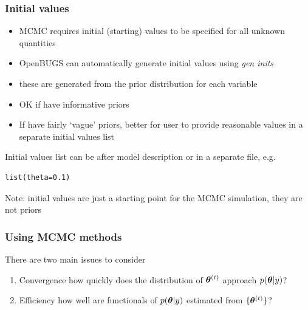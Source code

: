  \begin{frame}[fragile]

\frametitle{Initial values}

\begin{itemize}
\item MCMC requires initial (starting) values to be specified for all unknown quantities\vspace{2mm}
\item OpenBUGS can automatically generate initial values using \emph{gen inits}\vspace{1mm}
      \bi
      \item these are generated from the prior distribution for each variable\vspace{2mm}
      \ei
\item OK if have informative priors\vspace{2mm}
\item  If have fairly \lq vague' priors, better for user to provide reasonable values in a separate initial values list\vspace{2mm}
\end{itemize}

Initial values list can be after model description or in a separate file, e.g.\vspace{-1mm}
\begin{verbatim}
list(theta=0.1)
\end{verbatim}\vspace{-1mm}
Note: initial values are just a starting point for the MCMC simulation, they are \alert{not} priors

\end{frame}


 \begin{frame}

 \frametitle{Using MCMC methods}

There are two main issues to consider\vspace{2mm}
\begin{enumerate}
\item Convergence\vspace{1mm}
  \bi
  \I how quickly does the distribution of
$\boldsymbol{\theta}^{(t)}$ approach $p(\boldsymbol{\theta}|y)$?\vspace{2mm}
  \ei
\item Efficiency\vspace{1mm}
  \bi
  \I how well are functionals of $p(\boldsymbol{\theta}|y)$ estimated from
$\{\boldsymbol{\theta}^{(t)}\}$?
  \ei
\end{enumerate}

\end{frame}


